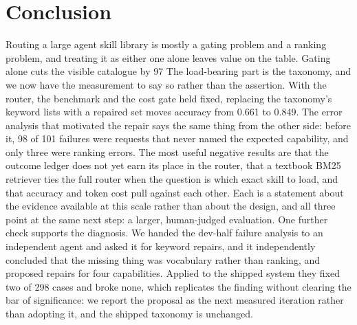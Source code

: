 \documentclass[sigconf,acmsmall]{acmart}
\begin{document}
\section{Conclusion}
Routing a large agent skill library is mostly a gating problem and a ranking problem, and treating it as either one alone leaves value on the table. Gating alone cuts the visible catalogue by 97%
The load-bearing part is the taxonomy, and we now have the measurement to say so rather than the assertion. With the router, the benchmark and the cost gate held fixed, replacing the taxonomy's keyword lists with a repaired set moves accuracy from 0.661 to 0.849. The error analysis that motivated the repair says the same thing from the other side: before it, 98 of 101 failures were requests that never named the expected capability, and only three were ranking errors.
The most useful negative results are that the outcome ledger does not yet earn its place in the router, that a textbook BM25 retriever ties the full router when the question is which exact skill to load, and that accuracy and token cost pull against each other. Each is a statement about the evidence available at this scale rather than about the design, and all three point at the same next step: a larger, human-judged evaluation.
One further check supports the diagnosis. We handed the dev-half failure analysis to an independent agent and asked it for keyword repairs, and it independently concluded that the missing thing was vocabulary rather than ranking, and proposed repairs for four capabilities. Applied to the shipped system they fixed two of 298 cases and broke none, which replicates the finding without clearing the bar of significance: we report the proposal as the next measured iteration rather than adopting it, and the shipped taxonomy is unchanged.
\end{document}

